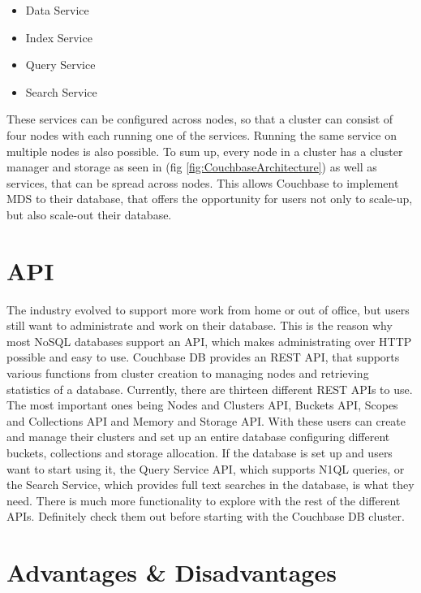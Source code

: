 \begin{itemize}
    \item Data Service
    \item Index Service
    \item Query Service
    \item Search Service
\end{itemize}
These services can be configured across nodes, so that a cluster can consist of four nodes with each running one of the services. Running the same service on multiple nodes is also possible. \parencite{CouchbaseIntroduction} \newline
To sum up, every node in a cluster has a cluster manager and storage as seen in (fig \ref{fig:CouchbaseArchitecture}) as well as services, that can be spread across nodes. This allows Couchbase to implement \ac{MDS} to their database, that offers the opportunity for users not only to scale-up, but also scale-out their database. \parencite{CouchbasePaper}


\section{API}
The industry evolved to support more work from home or out of office, but users still want to administrate and work on their database. This is the reason why most \ac{NoSQL} databases support an \ac{API}, which makes administrating over \ac{HTTP} possible and easy to use.\newline
Couchbase DB provides an \ac{REST} \ac{API}, that supports various functions from cluster creation to managing nodes and retrieving statistics of a database. Currently, there are thirteen different \ac{REST} \acp{API} to use. The most important ones being Nodes and Clusters \ac{API}, Buckets \ac{API}, Scopes and Collections \ac{API} and Memory and Storage \ac{API}. With these users can create and manage their clusters and set up an entire database configuring different buckets, collections and storage allocation. If the database is set up and users want to start using it, the Query Service \ac{API}, which supports \ac{N1QL} queries, or the Search Service, which provides full text searches in the database, is what they need. \parencite{CouchbaseAPI}\newline
There is much more functionality to explore with the rest of the different \acp{API}. Definitely check them out before starting with the Couchbase DB cluster.


\section{Advantages \& Disadvantages}

